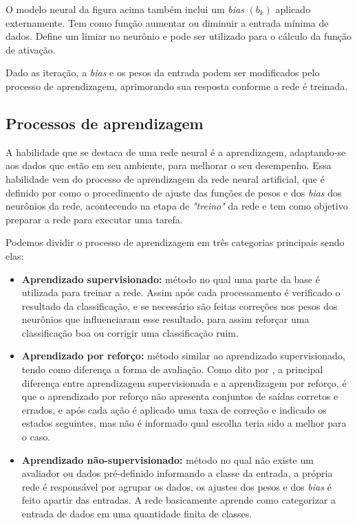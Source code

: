 \par O modelo neural da figura acima também inclui um \textit{bias} $(b_k)$ aplicado externamente. Tem como função aumentar ou diminuir a entrada mínima de dados. Define um limiar no neurônio e pode ser utilizado para o cálculo da função de ativação. 
\par Dado as iteração, a \textit{bias} e os pesos da entrada podem ser modificados pelo processo de aprendizagem, aprimorando sua resposta conforme a rede é treinada.  
\subsection{Processos de aprendizagem}
A habilidade que se destaca de uma rede neural é a aprendizagem, adaptando-se aos dados que estão em seu ambiente, para melhorar o seu desempenho. Essa habilidade vem do processo de aprendizagem da rede neural artificial, que é definido por  como o procedimento de ajuste das funções de pesos e dos \textit{bias} dos neurônios da rede, acontecendo na etapa de \textit{"treino"} da rede e tem como objetivo preparar a rede para executar uma tarefa. 
\par Podemos dividir o processo de aprendizagem em três categorias principais sendo elas:
\begin{itemize}
\item \textbf{Aprendizado supervisionado:} método no qual uma parte da base é utilizada para treinar a rede. Assim após cada processamento é verificado o resultado da classificação, e se necessário são feitas correções nos pesos dos neurônios que influenciaram esse resultado, para assim reforçar uma classificação boa ou corrigir uma classificação ruim.
\item \textbf{Aprendizado por reforço:} método similar ao aprendizado supervisionado, tendo como diferença a forma de avaliação. Como dito por , a principal diferença entre aprendizagem supervisionada e a aprendizagem por reforço, é que o aprendizado por reforço não apresenta conjuntos de saídas corretos e errados, e após cada ação é aplicado uma taxa de correção e indicado os estados seguintes, mas não é informado qual escolha teria sido a melhor para o caso.
\item \textbf{Aprendizado não-supervisionado:} método no qual não existe um avaliador ou dados pré-definido informando a classe da entrada, a própria rede é responsável por agrupar os dados, os ajustes dos pesos e dos \textit{bias} é feito apartir das entradas. A rede basicamente aprende como categorizar a entrada de dados em uma quantidade finita de classes. 
\end{itemize}	
